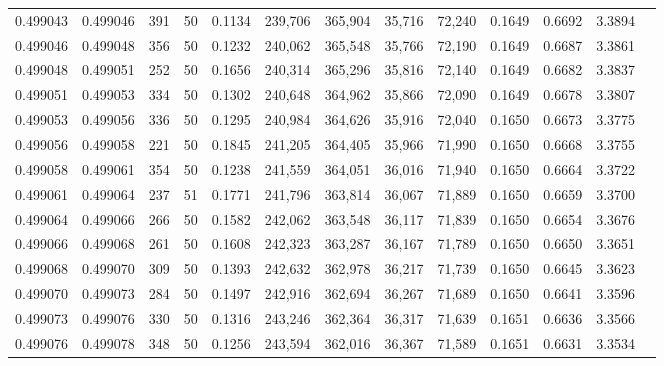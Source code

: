 \begin{tabular}{rrrrrrrrrrrrr}
0.499043 & 0.499046 & 391 &  50 &                                     0.1134 & 239,706 & 365,904 &  35,716 &  72,240 & 0.1649 & 0.6692 & 3.3894 \\
0.499046 & 0.499048 & 356 &  50 &                                     0.1232 & 240,062 & 365,548 &  35,766 &  72,190 & 0.1649 & 0.6687 & 3.3861 \\
0.499048 & 0.499051 & 252 &  50 &                                     0.1656 & 240,314 & 365,296 &  35,816 &  72,140 & 0.1649 & 0.6682 & 3.3837 \\
0.499051 & 0.499053 & 334 &  50 &                                     0.1302 & 240,648 & 364,962 &  35,866 &  72,090 & 0.1649 & 0.6678 & 3.3807 \\
0.499053 & 0.499056 & 336 &  50 &                                     0.1295 & 240,984 & 364,626 &  35,916 &  72,040 & 0.1650 & 0.6673 & 3.3775 \\
0.499056 & 0.499058 & 221 &  50 &                                     0.1845 & 241,205 & 364,405 &  35,966 &  71,990 & 0.1650 & 0.6668 & 3.3755 \\
0.499058 & 0.499061 & 354 &  50 &                                     0.1238 & 241,559 & 364,051 &  36,016 &  71,940 & 0.1650 & 0.6664 & 3.3722 \\
0.499061 & 0.499064 & 237 &  51 &                                     0.1771 & 241,796 & 363,814 &  36,067 &  71,889 & 0.1650 & 0.6659 & 3.3700 \\
0.499064 & 0.499066 & 266 &  50 &                                     0.1582 & 242,062 & 363,548 &  36,117 &  71,839 & 0.1650 & 0.6654 & 3.3676 \\
0.499066 & 0.499068 & 261 &  50 &                                     0.1608 & 242,323 & 363,287 &  36,167 &  71,789 & 0.1650 & 0.6650 & 3.3651 \\
0.499068 & 0.499070 & 309 &  50 &                                     0.1393 & 242,632 & 362,978 &  36,217 &  71,739 & 0.1650 & 0.6645 & 3.3623 \\
0.499070 & 0.499073 & 284 &  50 &                                     0.1497 & 242,916 & 362,694 &  36,267 &  71,689 & 0.1650 & 0.6641 & 3.3596 \\
0.499073 & 0.499076 & 330 &  50 &                                     0.1316 & 243,246 & 362,364 &  36,317 &  71,639 & 0.1651 & 0.6636 & 3.3566 \\
0.499076 & 0.499078 & 348 &  50 &                                     0.1256 & 243,594 & 362,016 &  36,367 &  71,589 & 0.1651 & 0.6631 & 3.3534 \\

\end{tabular}
